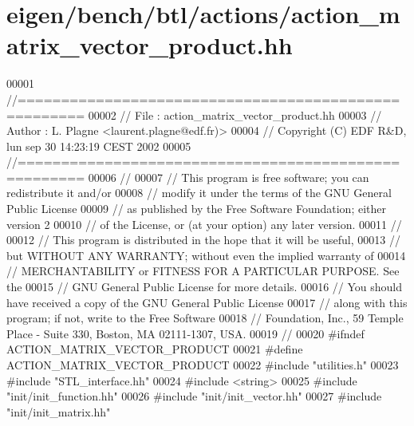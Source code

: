 \hypertarget{eigen_2bench_2btl_2actions_2action__matrix__vector__product_8hh_source}{}\section{eigen/bench/btl/actions/action\+\_\+matrix\+\_\+vector\+\_\+product.hh}
\label{eigen_2bench_2btl_2actions_2action__matrix__vector__product_8hh_source}

\begin{DoxyCode}
00001 \textcolor{comment}{//=====================================================}
00002 \textcolor{comment}{// File   :  action\_matrix\_vector\_product.hh}
00003 \textcolor{comment}{// Author :  L. Plagne <laurent.plagne@edf.fr)>}
00004 \textcolor{comment}{// Copyright (C) EDF R&D,  lun sep 30 14:23:19 CEST 2002}
00005 \textcolor{comment}{//=====================================================}
00006 \textcolor{comment}{//}
00007 \textcolor{comment}{// This program is free software; you can redistribute it and/or}
00008 \textcolor{comment}{// modify it under the terms of the GNU General Public License}
00009 \textcolor{comment}{// as published by the Free Software Foundation; either version 2}
00010 \textcolor{comment}{// of the License, or (at your option) any later version.}
00011 \textcolor{comment}{//}
00012 \textcolor{comment}{// This program is distributed in the hope that it will be useful,}
00013 \textcolor{comment}{// but WITHOUT ANY WARRANTY; without even the implied warranty of}
00014 \textcolor{comment}{// MERCHANTABILITY or FITNESS FOR A PARTICULAR PURPOSE.  See the}
00015 \textcolor{comment}{// GNU General Public License for more details.}
00016 \textcolor{comment}{// You should have received a copy of the GNU General Public License}
00017 \textcolor{comment}{// along with this program; if not, write to the Free Software}
00018 \textcolor{comment}{// Foundation, Inc., 59 Temple Place - Suite 330, Boston, MA  02111-1307, USA.}
00019 \textcolor{comment}{//}
00020 \textcolor{preprocessor}{#ifndef ACTION\_MATRIX\_VECTOR\_PRODUCT}
00021 \textcolor{preprocessor}{#define ACTION\_MATRIX\_VECTOR\_PRODUCT}
00022 \textcolor{preprocessor}{#include "utilities.h"}
00023 \textcolor{preprocessor}{#include "STL\_interface.hh"}
00024 \textcolor{preprocessor}{#include <string>}
00025 \textcolor{preprocessor}{#include "init/init\_function.hh"}
00026 \textcolor{preprocessor}{#include "init/init\_vector.hh"}
00027 \textcolor{preprocessor}{#include "init/init\_matrix.hh"}

\end{DoxyCode}
